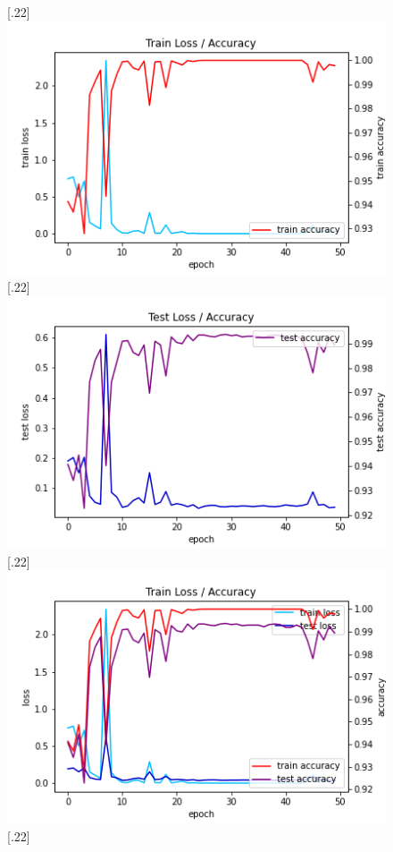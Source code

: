 \documentclass{article}
\begin{document}
\begin{figure}[H]
	\centering
	[.22\textwidth] {
		\includegraphics[scale=0.26]{images/train.png}
	}
	[.22\textwidth] {
		\includegraphics[scale=0.26]{images/test.png}
	}
	[.22\textwidth] {
		\includegraphics[scale=0.26]{images/train_test.png}
	}
	[.22\textwidth] {
}
\end{figure}
\end{document}

